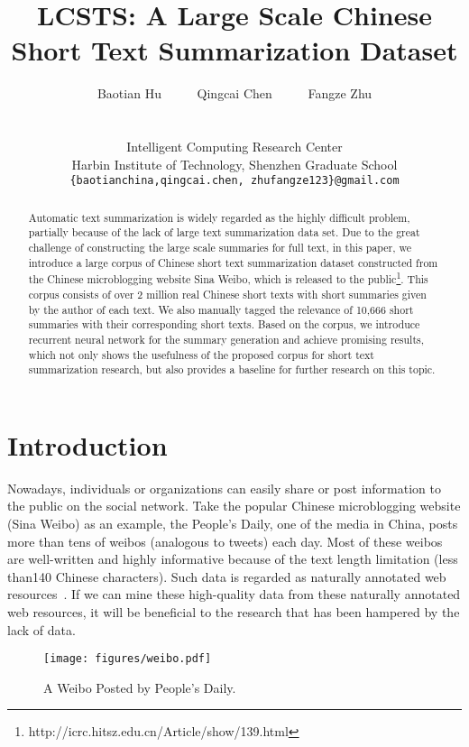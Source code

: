 \documentclass[11pt,a4paper]{article}
\title{LCSTS: A Large Scale Chinese Short Text Summarization Dataset}
\author{  Baotian Hu~~~~~ Qingcai Chen~~~~~ Fangze Zhu
\\
\\
\begin{tabular}{c}
 { Intelligent Computing Research Center}    \\
 {Harbin Institute of Technology, Shenzhen Graduate School}            \\
 {\tt \{baotianchina,qingcai.chen, zhufangze123\}@gmail.com} \\
\end{tabular}
}
\begin{document}
\maketitle
\begin{abstract}
Automatic text summarization is widely regarded as the highly difficult problem, partially because of the lack of large text summarization data set. Due to the great challenge of constructing the large scale summaries for full text, in this paper, we introduce a large corpus of Chinese short text summarization dataset constructed from the Chinese microblogging website Sina Weibo, which is released to the public\footnote{http://icrc.hitsz.edu.cn/Article/show/139.html}. This corpus consists of over 2 million real Chinese short texts with short summaries given by the author of each text. We also manually tagged the relevance of 10,666 short summaries with their corresponding short texts. Based on the corpus, we introduce recurrent neural network for the summary generation and achieve promising results, which not only shows the usefulness of the proposed corpus for short text summarization research, but also provides a baseline for further research on this topic.

\end{abstract}
\section{Introduction}
\vspace{-2pt}
Nowadays, individuals or organizations can easily share or post information to the public on the social network. Take the popular Chinese microblogging website (Sina Weibo) as an example, the People's Daily, one of the media in China, posts more than tens of weibos (analogous to tweets) each day. Most of these weibos are well-written and highly informative because of the text length limitation (less than140 Chinese characters). Such data is regarded as naturally annotated web resources~\cite{sun}. If we can mine these high-quality data from these naturally annotated web resources, it will be beneficial to the research that has been hampered by the lack of data.

\begin{figure}[!tb]
\centering
\texttt{[image: figures/weibo.pdf]}
\vspace{-20pt}
\caption{A Weibo Posted by People's Daily. }
\label{weibo-example}
\vspace{-15pt}
\end{figure}
\end{document}
